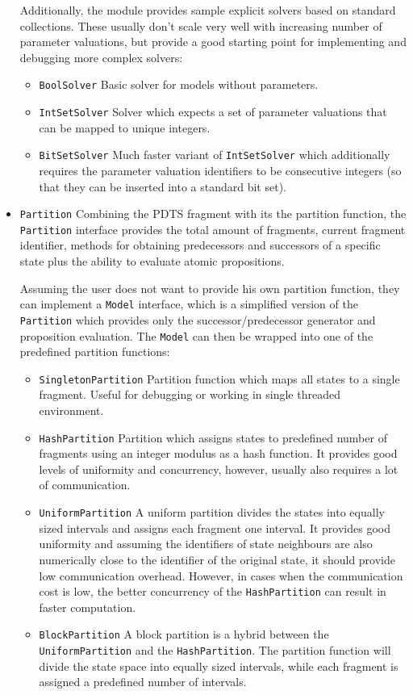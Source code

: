 \begin{itemize}
	Additionally, the module provides sample explicit solvers based on standard collections. These usually don't scale very well with increasing number of parameter valuations, but provide a good starting point for implementing and debugging more complex solvers:
	
	\begin{itemize}
		\item \texttt{BoolSolver} Basic solver for models without parameters.
		\item \texttt{IntSetSolver} Solver which expects a set of parameter valuations that can be mapped to unique integers.
		\item \texttt{BitSetSolver} Much faster variant of \texttt{IntSetSolver} which additionally requires the parameter valuation identifiers to be consecutive integers (so that they can be inserted into a standard bit set).
	\end{itemize}
	
	\item \texttt{Partition} Combining the \ac{PDTS} fragment with its the partition function, the \texttt{Partition} interface provides the total amount of fragments, current fragment identifier, methods for obtaining predecessors and successors of a specific state plus the ability to evaluate atomic propositions.
	
	Assuming the user does not want to provide his own partition function, they can implement a \texttt{Model} interface, which is a simplified version of the \texttt{Partition} which provides only the successor/predecessor generator and proposition evaluation. The \texttt{Model} can then be wrapped into one of the predefined partition functions:
	
	\begin{itemize}
		\item \texttt{SingletonPartition} Partition function which maps all states to a single fragment. Useful for debugging or working in single threaded environment.
		\item \texttt{HashPartition} Partition which assigns states to predefined number of fragments using an integer modulus as a hash function. It provides good levels of uniformity and concurrency, however, usually also requires a lot of communication.
		\item \texttt{UniformPartition} A uniform partition divides the states into equally sized intervals and assigns each fragment one interval. It provides good uniformity and assuming the identifiers of state neighbours are also numerically close to the identifier of the original state, it should provide low communication overhead. However, in cases when the communication cost is low, the better concurrency of the \texttt{HashPartition} can result in faster computation.
		\item \texttt{BlockPartition} A block partition is a hybrid between the \texttt{UniformPartition} and the \texttt{HashPartition}. The partition function will divide the state space into equally sized intervals, while each fragment is assigned a predefined number of intervals.
	\end{itemize}


\end{itemize}
